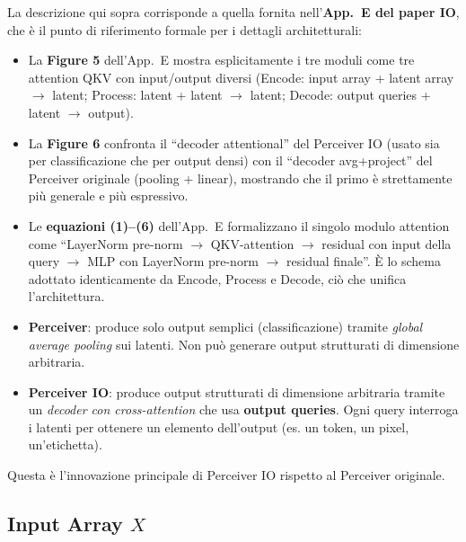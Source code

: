 \documentclass[
  11pt,
]{article}
\begin{document}
\begin{notabox}[title={\textbf{Riferimenti paper per questa architettura}}]
La descrizione qui sopra corrisponde a quella fornita nell'\textbf{App.\ E del paper IO}, che è il punto di riferimento formale per i dettagli architetturali:
\begin{itemize}\setlength\itemsep{0.1em}
\item La \textbf{Figure 5} dell'App.\ E mostra esplicitamente i tre moduli come tre attention QKV con input/output diversi (Encode: input array + latent array $\to$ latent; Process: latent + latent $\to$ latent; Decode: output queries + latent $\to$ output).
\item La \textbf{Figure 6} confronta il ``decoder attentional'' del Perceiver IO (usato sia per classificazione che per output densi) con il ``decoder avg+project'' del Perceiver originale (pooling + linear), mostrando che il primo è strettamente più generale e più espressivo.
\item Le \textbf{equazioni (1)--(6)} dell'App.\ E formalizzano il singolo modulo attention come ``LayerNorm pre-norm $\to$ QKV-attention $\to$ residual con input della query $\to$ MLP con LayerNorm pre-norm $\to$ residual finale''. È lo schema adottato identicamente da Encode, Process e Decode, ciò che unifica l'architettura.
\end{itemize}
\end{notabox}

\begin{notabox}[title={\textbf{Differenza chiave: Perceiver vs Perceiver IO}}]
\begin{itemize}
\item \textbf{Perceiver}: produce solo output semplici (classificazione) tramite \emph{global average pooling} sui latenti. Non può generare output strutturati di dimensione arbitraria.
\item \textbf{Perceiver IO}: produce output strutturati di dimensione arbitraria tramite un \emph{decoder con cross-attention} che usa \textbf{output queries}. Ogni query interroga i latenti per ottenere un elemento dell'output (es. un token, un pixel, un'etichetta).
\end{itemize}
Questa è l'innovazione principale di Perceiver IO rispetto al Perceiver originale.
\end{notabox}

\subsection{Input Array $X$}
\end{document}
